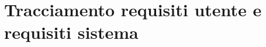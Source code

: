 \section{Tracciamento requisiti utente e requisiti sistema}

\newcommand{\vertical}[1]{\rotatebox[origin=c]{90}{#1}}
\newcommand{\V}{\checkmark}


